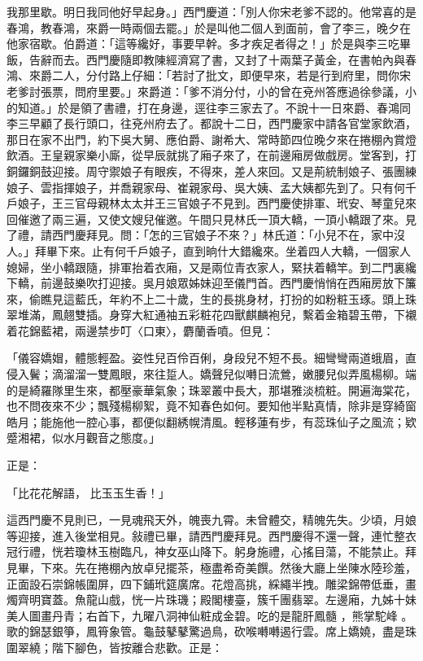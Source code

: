 我那里歇。明日我同他好早起身。」西門慶道：「別人你宋老爹不認的。他常喜的是春鴻，教春鴻，來爵一時兩個去罷。」於是叫他二個人到面前，會了李三，晚夕在他家宿歇。伯爵道：「這等纔好，事要早幹。多才疾足者得之！」於是與李三吃畢飯，告辭而去。西門慶隨即教陳經濟寫了書，又封了十兩葉子黃金，在書帕內與春鴻、來爵二人，分付路上仔細：「若討了批文，即便早來，若是行到府里，問你宋老爹討張票，問府里要。」來爵道：「爹不消分付，小的曾在兗州答應過徐參議，小的知道。」於是領了書禮，打在身邊，逕往李三家去了。不說十一日來爵、春鴻同李三早顧了長行頭口，往兗州府去了。都說十二日，西門慶家中請各官堂家飲酒，那日在家不出門，約下吳大舅、應伯爵、謝希大、常時節四位晚夕來在捲棚內賞燈飲酒。王皇親家樂小廝，從早辰就挑了廂子來了，在前邊廂房做戲房。堂客到，打銅鑼銅鼓迎接。周守禦娘子有眼疾，不得來，差人來回。又是荊統制娘子、張團練娘子、雲指揮娘子，并喬親家母、崔親家母、吳大姨、孟大姨都先到了。只有何千戶娘子，王三官母親林太太并王三官娘子不見到。西門慶使排軍、玳安、琴童兒來回催邀了兩三遍，又使文嫂兒催邀。午間只見林氏一頂大轎，一頂小轎跟了來。見了禮，請西門慶拜見。問：「怎的三官娘子不來？」林氏道：「小兒不在，家中沒人。」拜畢下來。止有何千戶娘子，直到晌什大錯纔來。坐着四人大轎，一個家人媳婦，坐小轎跟隨，排軍抬着衣廂，又是兩位青衣家人，緊扶着轎竿。到二門裏纔下轎，前邊鼓樂吹打迎接。吳月娘眾姊妹迎至儀門首。西門慶悄悄在西廂房放下簾來，偷瞧見這藍氏，年約不上二十歲，生的長挑身材，打扮的如粉粧玉琢。頭上珠翠堆滿，鳳翹雙插。身穿大紅通袖五彩粧花四獸麒麟袍兒，繫着金箱碧玉帶，下襯着花錦藍裙，兩邊禁步叮〈口東〉，麝蘭香噴。但見：

「儀容嬌媢，體態輕盈。姿性兒百伶百俐，身段兒不短不長。細彎彎兩道蛾眉，直侵入鬢；滴溜溜一雙鳳眼，來往踅人。嬌聲兒似囀日流鶯，嫩腰兒似弄風楊柳。端的是綺羅隊里生來，都壓豪華氣象；珠翠叢中長大，那堪雅淡梳粧。開遍海棠花，也不問夜來不少；飄殘楊柳絮，竟不知春色如何。要知他半點真情，除非是穿綺窗皓月；能施他一腔心事，都便似翻綉幌清風。輕移蓮有步，有蕊珠仙子之風流；欵蹙湘裙，似水月觀音之態度。」

正是：

「比花花解語，  比玉玉生香！」

這西門慶不見則已，一見魂飛天外，魄喪九霄。未曾體交，精魄先失。少頃，月娘等迎接，進入後堂相見。敍禮已畢，請西門慶拜見。西門慶得不還一聲，連忙整衣冠行禮，恍若瓊林玉樹臨凡，神女巫山降下。躬身施禮，心搖目蕩，不能禁止。拜見畢，下來。先在捲棚內放卓兒擺茶，極盡希奇美饌。然後大廳上坐陳水陸珍羞，正面設石崇錦帳圍屏，四下鋪玳筵廣席。花燈高挑，綵繩半拽。雕梁錦帶低垂，畫燭齊明寶蓋。魚龍山戲，恍一片珠璣；殿閣樓臺，簇千團翡翠。左邊廂，九姊十妹美人圖畫丹青；右首下，九曜八洞神仙粧成金碧。吃的是龍肝鳳髓 ，熊掌駝峰 。歌的錦瑟銀箏，鳳筲象管。龜鼓鼕鼕驚過鳥，砍喉囀囀遏行雲。席上嬌嬈，盡是珠圍翠繞；階下腳色，皆按離合悲歡。正是：

